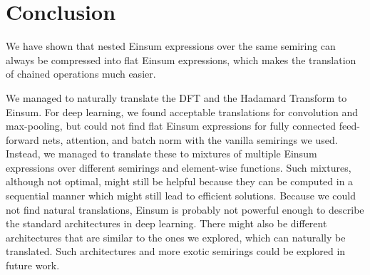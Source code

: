 \chapter{Conclusion}


We have shown that nested Einsum expressions over the same semiring can always be compressed into flat Einsum expressions, which makes the translation of chained operations much easier.

We managed to naturally translate the DFT and the Hadamard Transform to Einsum.
For deep learning, we found acceptable translations for convolution and max-pooling,
but could not find flat Einsum expressions for fully connected feed-forward nets, attention, and batch norm with the vanilla semirings we used.
Instead, we managed to translate these to mixtures of multiple Einsum expressions over different semirings and element-wise functions.
Such mixtures, although not optimal, might still be helpful because they can be computed in a sequential manner which might still lead to efficient solutions.
Because we could not find natural translations, Einsum is probably not powerful enough to describe the standard architectures in deep learning.
There might also be different architectures that are similar to the ones we explored, which can naturally be translated.
Such architectures and more exotic semirings could be explored in future work.
